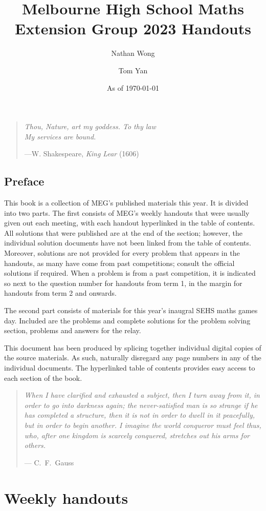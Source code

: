 \documentclass[a4paper]{amsbook}
\title{\textbf{Melbourne High School Maths Extension Group 2023 Handouts}}
\author{Nathan Wong\and Tom Yan}
\date{As of \today}
\newif\ifded
\newcommand{\epigraph}[2]{%
\newpage \vspace*{8cm}
\thispagestyle{empty}
  \begin{quote}
	  {	
    \emph{#1}
    \begin{flushright}---{#2}
    \end{flushright}}
  \end{quote}}
\begin{document}
\maketitle
\ifded
\newpage \vspace*{8cm}
\thispagestyle{empty}
\begin{center}
	  \emph{For Harold}
\end{center}
\fi
\epigraph{Thou, Nature, art my goddess. To thy law\\
My services are bound.}{W. Shakespeare, \emph{King Lear} (1606)}
\chapter*{Preface}
This book is a collection of MEG's published
materials this year. 
It is divided into two parts.
The first consists of MEG's weekly handouts
that were usually given out each meeting, with each
handout hyperlinked in the table of contents.
All solutions that were published are
at the end of the section; however, the individual
solution documents have not been linked from the table
of contents. Moreover, solutions are not provided
for every problem that appears in the handouts,
as many have come from past competitions; consult the official
solutions if required.
When a problem is from a past competition, it is indicated so
next to the question number for handouts from term 1, in the margin
for handouts from term 2 and onwards.

The second part consists of materials for this year's inaugral
SEHS maths games day. Included
are the problems and complete solutions for the problem
solving section, problems and answers for the relay.

This document has been produced by splicing together
individual digital copies of the source materials.
As such, naturally disregard any page numbers in any
of the individual documents. The hyperlinked table of contents
provides easy access to each section of the book.
\tableofcontents
\epigraph{ When I have clarified and exhausted a subject,
then I turn away from it, in order to go into darkness again;
the never-satisfied man is so strange if he has completed a structure,
then it is not in order to dwell in it peacefully, but in order to begin another.
I imagine the world conqueror must feel thus, who,
after one kingdom is scarcely conquered, stretches out his arms for others.}{%
	C.~F.~Gauss}
\part{Weekly handouts}
\end{document}
